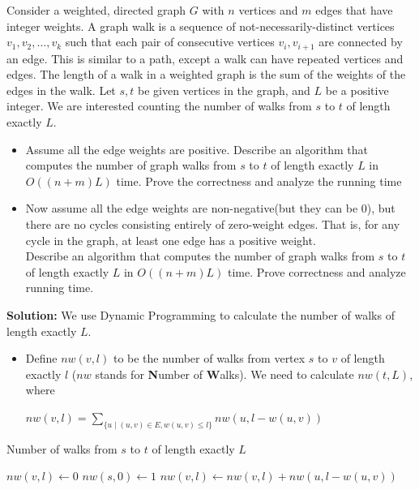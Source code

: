 \documentclass{article}
\newcounter{exercise}
\newcommand{\<}{
    \langle}
\renewcommand{\>}{
    \rangle}
\begin{document}
{    \newpage
\begin{exercise}
Consider a weighted, directed graph $G$ with $n$ vertices and $m$ edges that have integer weights. A graph walk is a sequence of
not-necessarily-distinct vertices $v_1,v_2,\ldots,v_k$ such that each pair of consecutive vertices $v_i,v_{i+1}$ are connected by an edge. This is similar to a path, except a walk can have repeated vertices and edges. The length of a walk in a weighted graph is the sum of the weights of the edges in the walk. Let $s,t$ be given vertices in the graph, and $L$ be a positive integer. We are interested counting the number of walks from $s$ to $t$ of length exactly $L$.
\begin{itemize}
\item Assume all the edge weights are positive. Describe an algorithm that computes the number of graph walks from $s$ to $t$ of length exactly $L$ in $O((n+m)L)$ time. Prove the correctness and analyze the running time
\item Now assume all the edge weights are non-negative(but they can be 0), but there are no cycles consisting entirely of zero-weight edges. That is, for any cycle in the graph, at least one edge has a positive weight.\\
Describe an algorithm that computes the number of graph walks from $s$ to $t$ of length exactly $L$ in $O((n+m)L)$ time. Prove correctness and analyze running time.
\end{itemize}
\end{exercise}

\textbf{Solution:} We use Dynamic Programming to calculate the number of walks of length exactly $L$. 
    \begin{itemize}
        \item Define $nw(v,l)$ to be the number of walks from vertex $s$ to $v$ of length exactly $l$ ($nw$ stands for \textbf{N}umber of \textbf{W}alks). We need to calculate $nw(t,L)$, where
        \begin{center} 
            $nw(v,l)=\sum\limits_{\{u\mid (u,v)\in E,w(u,v)\leq l\}}nw(u,l-w(u,v))$
        \end{center}
    \end{itemize}

\begin{algorithm}[htb]
    \label{algo:sss}
    \caption{Number of walks from $s$ to $t$ of length exactly $L$}
    \begin{algorithmic}[1]
                \State $nw(v,l)\leftarrow 0$
            \EndFor
        \EndFor
        \State
        \State $nw(s,0)\leftarrow  1$
                    \State $nw(v,l)\leftarrow nw(v,l)+nw(u,l-w(u,v))$ 
                \EndFor
            \EndFor
        \EndFor
    \end{algorithmic}
\end{algorithm}

}
\end{document}
